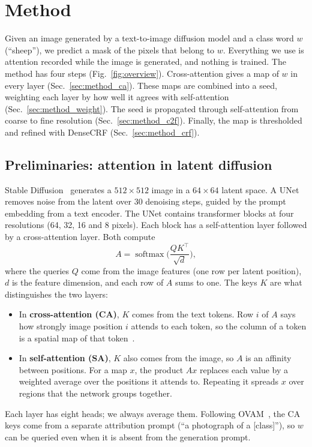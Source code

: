 \section{Method}
\label{sec:method}
Given an image generated by a text-to-image diffusion model and a class word $w$ (\eg ``sheep''), we predict a mask of the pixels that belong to $w$. Everything we use is attention recorded while the image is generated, and nothing is trained. The method has four steps (Fig.~\ref{fig:overview}). Cross-attention gives a map of $w$ in every layer (Sec.~\ref{sec:method_ca}). These maps are combined into a seed, weighting each layer by how well it agrees with self-attention (Sec.~\ref{sec:method_weight}). The seed is propagated through self-attention from coarse to fine resolution (Sec.~\ref{sec:method_c2f}). Finally, the map is thresholded and refined with DenseCRF (Sec.~\ref{sec:method_crf}).

\subsection{Preliminaries: attention in latent diffusion}
\label{sec:prelim}
Stable Diffusion~\cite{rombach2022ldm} generates a $512\times512$ image in a $64\times64$ latent space. A UNet removes noise from the latent over 30 denoising steps, guided by the prompt embedding from a text encoder. The UNet contains transformer blocks at four resolutions (64, 32, 16 and 8 pixels). Each block has a self-attention layer followed by a cross-attention layer. Both compute
\begin{equation}
A=\operatorname{softmax}\!\Big(\frac{QK^\top}{\sqrt d}\Big),
\label{eq:attention}
\end{equation}
where the queries $Q$ come from the image features (one row per latent position), $d$ is the feature dimension, and each row of $A$ sums to one. The keys $K$ are what distinguishes the two layers:
\begin{itemize}\setlength\itemsep{0pt}
\item In \textbf{cross-attention (CA)}, $K$ comes from the text tokens. Row $i$ of $A$ says how strongly image position $i$ attends to each token, so the column of a token is a spatial map of that token~\cite{tang2023daam}.
\item In \textbf{self-attention (SA)}, $K$ also comes from the image, so $A$ is an affinity between positions. For a map $x$, the product $Ax$ replaces each value by a weighted average over the positions it attends to. Repeating it spreads $x$ over regions that the network groups together.
\end{itemize}
Each layer has eight heads; we always average them. Following OVAM~\cite{marcosmanchon2024ovam}, the CA keys come from a separate attribution prompt (``a photograph of a [class]''), so $w$ can be queried even when it is absent from the generation prompt.

